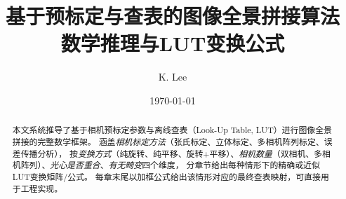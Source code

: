 \documentclass[12pt,a4paper]{ctexart}
\title{\textbf{基于预标定与查表的图像全景拼接算法\\[6pt] 数学推理与LUT变换公式}}
\author{K. Lee}
\date{\today}
\theoremstyle{definition}
\theoremstyle{definition}
\begin{document}
\maketitle
\thispagestyle{empty}

\begin{abstract}
\noindent 本文系统推导了基于相机预标定参数与离线查表（Look-Up Table, LUT）进行图像全景拼接的完整数学框架。
涵盖\emph{相机标定方法}（张氏标定、立体标定、多相机阵列标定、误差传播分析），
按\emph{变换方式}（纯旋转、纯平移、旋转+平移）、\emph{相机数量}（双相机、多相机阵列）、\emph{光心是否重合}、\emph{有无畸变}四个维度，
分章节给出每种情形下的精确或近似LUT变换矩阵/公式。
每章末尾以加框公式给出该情形对应的最终查表映射，可直接用于工程实现。
\end{abstract}

\newpage
\pagestyle{empty}
\tableofcontents

\newpage
{}
\setcounter{page}{1}
\pagestyle{fancy}










\appendix

\end{document}
